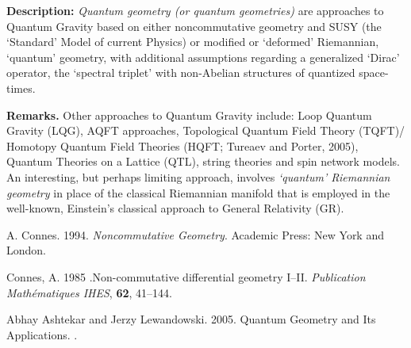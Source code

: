 \documentclass[12pt]{article}
\theoremstyle{plain}
\theoremstyle{definition}
\numberwithin{equation}{section}
\begin{document}
\textbf{Description:} 
\emph{Quantum geometry (or quantum geometries)} are approaches to Quantum Gravity
based on either noncommutative geometry and SUSY (the `Standard' Model of current Physics) \cite{AC94,CA85} or
modified or `deformed' Riemannian, `quantum' geometry, with additional assumptions regarding a generalized `Dirac' operator, the `spectral triplet' with non-Abelian structures of quantized space-times. 


\textbf{Remarks.}
Other approaches to Quantum Gravity include: Loop Quantum Gravity (LQG), AQFT approaches,
Topological Quantum Field Theory (TQFT)/ Homotopy Quantum Field Theories (HQFT; Tureaev and Porter, 2005),
Quantum Theories on a Lattice (QTL), string theories and spin network models. \\

An interesting, but perhaps limiting approach, involves \emph{`quantum' Riemannian geometry} \cite{AL2k5} in place of the classical Riemannian manifold that is employed in the well-known, Einstein's classical approach to General Relativity (GR). 


\begin{thebibliography}{9}
A. Connes. 1994. \emph{Noncommutative Geometry}. Academic Press: New York and London.

Connes, A. 1985 .Non-commutative differential geometry I--II. 
\emph{Publication Math\'ematiques IHES}, {\bf 62}, 41--144.
 
Abhay Ashtekar and Jerzy Lewandowski. 2005. Quantum Geometry and Its Applications.
.
\end{thebibliography}

\end{document}
